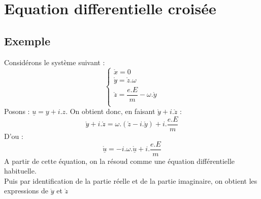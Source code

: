 \chapter{Equation differentielle croisée}
\section{Exemple}
Considérons le système suivant : 
\[\left\{\begin{array}{l}
  \mathring{x}\mathring{} = 0  \\
  \mathring{y}\mathring{} = \mathring{z}.\omega\\
  \mathring{z}\mathring{} = \dfrac{e.E}{m} - \omega.\mathring{y}\\
  \end{array}\right.\]
Posons : $\underline{u} = y + i.z$.
On obtient donc, en faisant $\mathring{y}\mathring{} + i.\mathring{z}\mathring{}$ :
$$\mathring{y}\mathring{} + i.\mathring{z}\mathring{} = \omega.(\mathring{z}-i.\mathring{y}) + i.\dfrac{e.E}{m}$$
D'ou :
$$\underline{\mathring{u}\mathring{}} = -i.\omega.\underline{\mathring{u}} + i.\dfrac{e.E}{m}$$
A partir de cette équation, on la résoud comme une équation différentielle habituelle.\\
Puis par identification de la partie réelle et de la partie imaginaire, on obtient les expressions de $\mathring{y}\mathring{}$ et $\mathring{z}\mathring{}$

